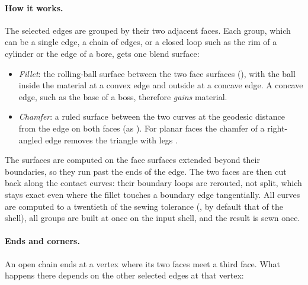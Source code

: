 \paragraph{How it works.} The selected edges are grouped by their two adjacent faces. Each
group, which can be a single edge, a chain of edges, or a closed loop such as the rim of a
cylinder or the edge of a bore, gets one blend surface:

\begin{itemize}
  \item \emph{Fillet}: the rolling-ball surface between the two face surfaces
    (), with the ball inside the material at a convex edge and outside
    at a concave edge. A concave edge, such as the base of a boss, therefore \emph{gains}
    material.
  \item \emph{Chamfer}: a ruled surface between the two curves at the geodesic distance
     from the edge on both faces (as ). For planar
    faces the chamfer of a right-angled edge removes the triangle with legs .
\end{itemize}

The surfaces are computed on the face surfaces extended beyond their boundaries, so they run
past the ends of the edge. The two faces are then cut back along the contact curves: their
boundary loops are rerouted, not split, which stays exact even where the fillet touches a
boundary edge tangentially. All curves are computed to a twentieth of the sewing tolerance
(, by default that of the shell), all groups are built at once on the input
shell, and the result is sewn once.

\paragraph{Ends and corners.} An open chain ends at a vertex where its two faces meet a third
face. What happens there depends on the other selected edges at that vertex:

